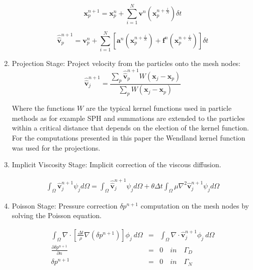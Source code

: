 \begin{enumerate}
\begin{equation}\label{Step2astep}
\mathbf{x}^{n+1}_{p}=\mathbf{x}^{n}_{p} + \sum_{i=1}^{N} \mathbf{v}^{n}(\mathbf{x}^{n+\frac{i}{N}}_{p}) \delta t
\end{equation}

\begin{equation}\label{Step2bstep}
\widehat{\widehat{\mathbf{v}}}^{n+1}_{p}=\mathbf{v}^{n}_{p} + \sum_{i=1}^{N} \left[\mathbf{a}^{n}(\mathbf{x}^{n+\frac{i}{N}}_{p}) + \mathbf{f}^{n} (\mathbf{x}^{n+\frac{i}{N}}_{p})\right]  \delta t
\end{equation}

  \item Projection Stage: Project velocity from the particles onto the mesh nodes:
  \begin{equation}\label{Step3a}
\displaystyle \widehat{\widehat{\mathbf{v}}}^{n+1}_{j}=\frac{\sum_{p} \widehat{\widehat{\mathbf{v}}}^{n+1}_{p} W(\mathbf{x}_{j}-\mathbf{x}_{p})}{\sum_{p} W(\mathbf{x}_{j}-\mathbf{x}_{p})}
\end{equation}



Where the functions $W$ are the typical kernel functions used in particle methods as for example SPH \cite{Mon77} and summations are extended to the particles within a critical distance that depends on the election of the kernel function. For the computations presented in this paper the Wendland kernel function \cite{Wendland} was used for the projections.

  \item Implicit Viscosity Stage: Implicit correction of the viscous diffusion.

 \begin{eqnarray}\label{Step4a}
\displaystyle \int_{\Omega} \widehat{\mathbf{v}}^{n+1}_{j}\psi_j d\Omega =\int_{\Omega} \widehat{\widehat{\mathbf{v}}}^{n+1}_{j}\psi_j d\Omega + \theta \Delta t \int_{\Omega} \mu \nabla^{2}\widehat{\mathbf{v}}^{n+1}_{j} \psi_j d\Omega
\end{eqnarray}



 \item Poisson Stage: Pressure correction $\delta p^{n+1}$ computation on the mesh nodes by solving the Poisson equation.


 \begin{eqnarray}\label{Step5a}
   \int_{\Omega} \nabla \cdot \left[\frac{\Delta t}{\rho}\nabla(\delta p^{n+1})\right] \phi_j\ d\Omega &=& \int_{\Omega} \nabla \cdot \widehat{\mathbf{v}}_j^{n+1} \phi_j\ d\Omega \\
   \frac{\partial \delta p^{n+1}}{\partial n} &=& 0 \quad in \quad \Gamma_D \\
   \delta p^{n+1} &=& 0 \quad in \quad \Gamma_N
 \end{eqnarray}


\end{enumerate}
